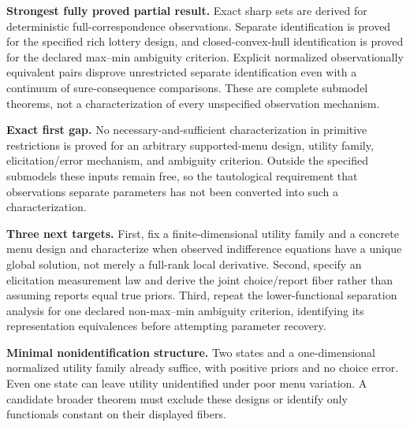 \documentclass[11pt,a4paper]{article}
\theoremstyle{definition}\newtheorem{definition}[theorem]{Definition}
\theoremstyle{remark}\newtheorem{remark}[theorem]{Remark}
\newcommand{\1}{\mathbf 1}
\begin{document}
\textbf{Strongest fully proved partial result.} Exact sharp sets are derived for deterministic full-correspondence observations. Separate identification is proved for the specified rich lottery design, and closed-convex-hull identification is proved for the declared max--min ambiguity criterion. Explicit normalized observationally equivalent pairs disprove unrestricted separate identification even with a continuum of sure-consequence comparisons. These are complete submodel theorems, not a characterization of every unspecified observation mechanism.

\textbf{Exact first gap.} No necessary-and-sufficient characterization in primitive restrictions is proved for an arbitrary supported-menu design, utility family, elicitation/error mechanism, and ambiguity criterion. Outside the specified submodels these inputs remain free, so the tautological requirement that observations separate parameters has not been converted into such a characterization.

\textbf{Three next targets.} First, fix a finite-dimensional utility family and a concrete menu design and characterize when observed indifference equations have a unique global solution, not merely a full-rank local derivative. Second, specify an elicitation measurement law and derive the joint choice/report fiber rather than assuming reports equal true priors. Third, repeat the lower-functional separation analysis for one declared non-max--min ambiguity criterion, identifying its representation equivalences before attempting parameter recovery.

\textbf{Minimal nonidentification structure.} Two states and a one-dimensional normalized utility family already suffice, with positive priors and no choice error. Even one state can leave utility unidentified under poor menu variation. A candidate broader theorem must exclude these designs or identify only functionals constant on their displayed fibers.
\end{document}
